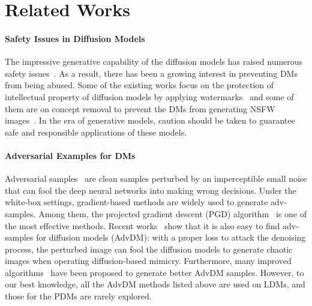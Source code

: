 \documentclass{article}
\begin{document}













%

\section{Related Works}

\paragraph{Safety Issues in Diffusion Models}
The impressive generative capability of the diffusion models has raised numerous safety issues~\cite{zhang2023text,setty2023,andersen2023}. As a result, there has been a growing interest in preventing DMs from being abused. Some of the existing works focus on the protection of intellectual property of diffusion models by applying watermarks~\citep{zhao2023recipe, peng2023protecting, cui2023diffusionshield} and some of them are on concept removal to prevent the DMs from generating NSFW images~\citep{heng2023continual,zhang2023forget,gandikota2023unified}. In the era of generative models, caution should be taken to guarantee safe and responsible applications of these models.

\paragraph{Adversarial Examples for DMs} Adversarial samples~\cite{goodfellow2014fgsm, carlini2017towards, glaze} are clean samples perturbed by an imperceptible small noise that can fool the deep neural networks into making wrong decisions. Under the white-box settings, gradient-based methods are widely used to generate adv-samples. Among them, the projected gradient descent (PGD) algorithm~\cite{pgd} is one of the most effective methods. Recent works~\citep{advdm, salman2023raising} show that it is also easy to find adv-samples for diffusion models (AdvDM): with a proper loss to attack the denoising process, the perturbed image can fool the diffusion models to generate chaotic images when operating diffusion-based mimicry. Furthermore, many improved algorithms~\cite{mist-v2,chen2024smoothattack,sdsattack} have been proposed to generate better AdvDM samples. However, to our best knowledge, all the AdvDM methods listed above are used on LDMs, and those for the PDMs are rarely explored.
\end{document}

